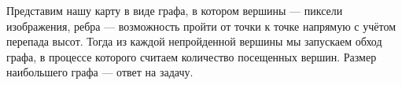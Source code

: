 \solutionSection

Представим нашу карту в виде графа, в котором вершины — пиксели изображения, ребра — возможность пройти от точки к точке напрямую с учётом перепада высот. Тогда из каждой непройденной вершины мы запускаем обход графа, в процессе которого считаем количество посещенных вершин. Размер наибольшего графа — ответ на задачу. 

\codeExample


